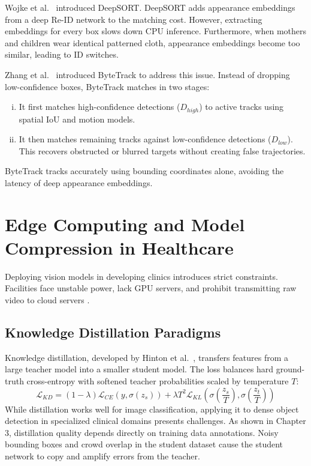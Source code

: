 Wojke et al.\ \cite{wojke2017deepsort} introduced DeepSORT. DeepSORT adds appearance embeddings from a deep Re-ID network to the matching cost. However, extracting embeddings for every box slows down CPU inference. Furthermore, when mothers and children wear identical patterned cloth, appearance embeddings become too similar, leading to ID switches.

Zhang et al.\ \cite{zhang2022bytetrack} introduced ByteTrack to address this issue. Instead of dropping low-confidence boxes, ByteTrack matches in two stages:
\begin{enumerate}[(i)]
    \item It first matches high-confidence detections ($D_{high}$) to active tracks using spatial IoU and motion models.
    \item It then matches remaining tracks against low-confidence detections ($D_{low}$). This recovers obstructed or blurred targets without creating false trajectories.
\end{enumerate}
ByteTrack tracks accurately using bounding coordinates alone, avoiding the latency of deep appearance embeddings.

\section{Edge Computing and Model Compression in Healthcare}
Deploying vision models in developing clinics introduces strict constraints. Facilities face unstable power, lack GPU servers, and prohibit transmitting raw video to cloud servers \cite{milkaite2019, addotey2023}.

\subsection{Knowledge Distillation Paradigms}
Knowledge distillation, developed by Hinton et al.\ \cite{hinton2015distilling}, transfers features from a large teacher model into a smaller student model. The loss balances hard ground-truth cross-entropy with softened teacher probabilities scaled by temperature $T$:
\begin{equation}
    \mathcal{L}_{KD} = (1 - \lambda) \mathcal{L}_{CE}(y, \sigma(z_s)) + \lambda T^2 \mathcal{L}_{KL}\left(\sigma\left(\frac{z_s}{T}\right), \sigma\left(\frac{z_t}{T}\right)\right)
\end{equation}
While distillation works well for image classification, applying it to dense object detection in specialized clinical domains presents challenges. As shown in Chapter 3, distillation quality depends directly on training data annotations. Noisy bounding boxes and crowd overlap in the student dataset cause the student network to copy and amplify errors from the teacher.

